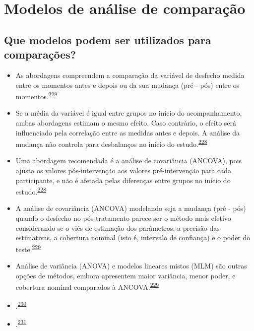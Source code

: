 \documentclass[
  a4paper,
]{book}
\begin{document}
\hypertarget{metodos-comparacao}{%
\section{Modelos de análise de comparação}\label{metodos-comparacao}}

\hypertarget{que-modelos-podem-ser-utilizados-para-comparauxe7uxf5es}{%
\subsection{Que modelos podem ser utilizados para comparações?}\label{que-modelos-podem-ser-utilizados-para-comparauxe7uxf5es}}

\begin{itemize}
\item
  As abordagens compreendem a comparação da variável de desfecho medida entre os momentos antes e depois ou da sua mudança (pré - pós) entre os momentos.\textsuperscript{\protect\hyperlink{ref-Vickers2001}{228}}
\item
  Se a média da variável é igual entre grupos no início do acompanhamento, ambas abordagens estimam o mesmo efeito. Caso contrário, o efeito será influenciado pela correlação entre as medidas antes e depois. A análise da mudança não controla para desbalanços no início do estudo.\textsuperscript{\protect\hyperlink{ref-Vickers2001}{228}}
\item
  Uma abordagem recomendada é a análise de covariância (ANCOVA), pois ajusta os valores pós-intervenção aos valores pré-intervenção para cada participante, e não é afetada pelas diferenças entre grupos no início do estudo.\textsuperscript{\protect\hyperlink{ref-Vickers2001}{228}}
\item
  A análise de covariância (ANCOVA) modelando seja a mudança (pré - pós) quando o desfecho no pós-tratamento parece ser o método mais efetivo considerando-se o viés de estimação dos parâmetros, a precisão das estimativas, a cobertura nominal (isto é, intervalo de confiança) e o poder do teste.\textsuperscript{\protect\hyperlink{ref-OConnell2017}{229}}
\item
  Análise de variância (ANOVA) e modelos lineares mistos (MLM) são outras opções de métodos, embora apresentem maior variância, menor poder, e cobertura nominal comparados à ANCOVA.\textsuperscript{\protect\hyperlink{ref-OConnell2017}{229}}
\item
  .\textsuperscript{\protect\hyperlink{ref-Cnaan1997}{230}}
\item
  .\textsuperscript{\protect\hyperlink{ref-mallinckrodt2008}{231}}
\end{itemize}
\end{document}
